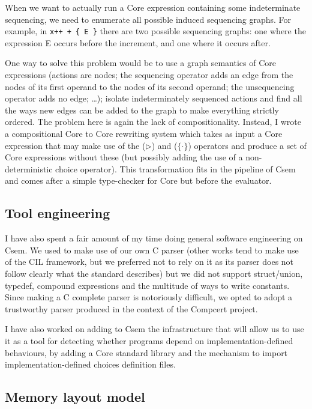 \documentclass[11pt,a4paper, twocolumn]{article}
\begin{document}
When we want to actually run a Core expression containing some
indeterminate sequencing, we need to enumerate all possible induced
sequencing graphs. For example, in \texttt{x++~+~\{ E \}} there are
two possible sequencing graphs: one where the expression E occurs
before the increment, and one where it occurs after.

One way to solve this problem would be to use a graph semantics of
Core expressions (actions are nodes; the sequencing operator adds an
edge from the nodes of its first operand to the nodes of its second
operand; the unsequencing operator adds no edge; \dots); isolate
indeterminately sequenced actions and find all the ways new edges can
be added to the graph to make everything strictly ordered. The problem
here is again the lack of compositionality. Instead, I wrote a
compositional Core to Core rewriting system which takes as input a
Core expression that may make use of the ($\rhd$) and ($\{ \cdot \}$)
operators and produce a set of Core expressions without these (but
possibly adding the use of a non-deterministic choice operator). This
transformation fits in the pipeline of Csem and comes after a simple
type-checker for Core but before the evaluator.


\subsection*{Tool engineering}

I have also spent a fair amount of my time doing general software
engineering on Csem. We used to make use of our own C parser (other
works tend to make use of the CIL framework, but we preferred not to
rely on it as its parser does not follow clearly what the standard
describes) but we did not support struct/union, typedef, compound
expressions and the multitude of ways to write constants. Since making
a C complete parser is notoriously difficult, we opted to adopt a
trustworthy parser produced in the context of the Compcert project.

I have also worked on adding to Csem the infrastructure that will
allow us to use it as a tool for detecting whether programs depend on
implementation-defined behaviours, by adding a Core standard library
and the mechanism to import implementation-defined choices definition
files.


\subsection*{Memory layout model}
\end{document}
